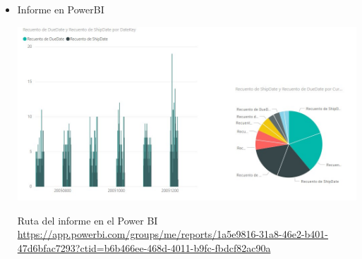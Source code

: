\begin{itemize}
	\item Informe en PowerBI
	\begin{center}
	\includegraphics[width=16cm]{./Imagenes/imgpbi2} 
	\end{center}

Ruta del informe en el Power BI
\\
\url{https://app.powerbi.com/groups/me/reports/1a5e9816-31a8-46e2-b401-47d6bfac7293?ctid=b6b466ee-468d-4011-b9fc-fbdcf82ac90a} 
\end{itemize} 